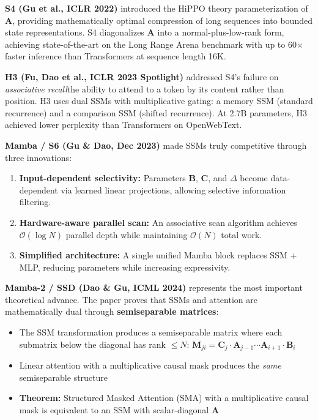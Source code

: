 \documentclass[11pt,a4paper]{article}
\begin{document}
\textbf{S4 (Gu et al., ICLR 2022)} introduced the HiPPO theory parameterization of $\mathbf{A}$, providing mathematically optimal compression of long sequences into bounded state representations. S4 diagonalizes $\mathbf{A}$ into a normal-plus-low-rank form, achieving state-of-the-art on the Long Range Arena benchmark with up to 60$\times$ faster inference than Transformers at sequence length 16K.

\textbf{H3 (Fu, Dao et al., ICLR 2023 Spotlight)} addressed S4's failure on \textit{associative recall}\textemdash the ability to attend to a token by its content rather than position. H3 uses dual SSMs with multiplicative gating: a memory SSM (standard recurrence) and a comparison SSM (shifted recurrence). At 2.7B parameters, H3 achieved lower perplexity than Transformers on OpenWebText.

\textbf{Mamba / S6 (Gu \& Dao, Dec 2023)} made SSMs truly competitive through three innovations:
\begin{enumerate}[leftmargin=*]
    \item \textbf{Input-dependent selectivity:} Parameters $\mathbf{B}$, $\mathbf{C}$, and $\Delta$ become data-dependent via learned linear projections, allowing selective information filtering.
    \item \textbf{Hardware-aware parallel scan:} An associative scan algorithm achieves $\mathcal{O}(\log N)$ parallel depth while maintaining $\mathcal{O}(N)$ total work.
    \item \textbf{Simplified architecture:} A single unified Mamba block replaces SSM + MLP, reducing parameters while increasing expressivity.
\end{enumerate}

\textbf{Mamba-2 / SSD (Dao \& Gu, ICML 2024)} represents the most important theoretical advance. The paper proves that SSMs and attention are mathematically dual through \textbf{semiseparable matrices}:

\begin{itemize}[leftmargin=*]
    \item The SSM transformation produces a semiseparable matrix where each submatrix below the diagonal has rank $\leq N$: $\mathbf{M}_{ji} = \mathbf{C}_j \cdot \mathbf{A}_{j-1} \cdots \mathbf{A}_{i+1} \cdot \mathbf{B}_i$
    \item Linear attention with a multiplicative causal mask produces the \textit{same} semiseparable structure
    \item \textbf{Theorem:} Structured Masked Attention (SMA) with a multiplicative causal mask is equivalent to an SSM with scalar-diagonal $\mathbf{A}$
\end{itemize}
\end{document}
